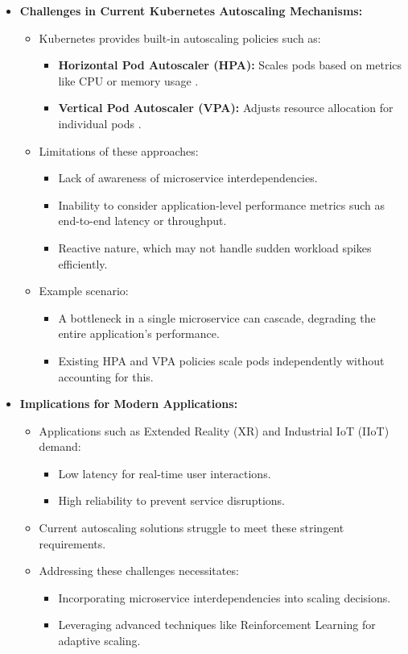 \documentclass[conference]{IEEEtran}
\begin{document}
\begin{itemize}
    \item \textbf{Challenges in Current Kubernetes Autoscaling Mechanisms:}
    \begin{itemize}
        \item Kubernetes provides built-in autoscaling policies such as:
        \begin{itemize}
            \item \textbf{Horizontal Pod Autoscaler (HPA):} Scales pods based on metrics like CPU or memory usage \cite{kubernetesHPA}.
            \item \textbf{Vertical Pod Autoscaler (VPA):} Adjusts resource allocation for individual pods \cite{kubernetesVPA}.
        \end{itemize}
        \item Limitations of these approaches:
        \begin{itemize}
            \item Lack of awareness of microservice interdependencies.
            \item Inability to consider application-level performance metrics such as end-to-end latency or throughput.
            \item Reactive nature, which may not handle sudden workload spikes efficiently.
        \end{itemize}
        \item Example scenario:
        \begin{itemize}
            \item A bottleneck in a single microservice can cascade, degrading the entire application's performance.
            \item Existing HPA and VPA policies scale pods independently without accounting for this.
        \end{itemize}
    \end{itemize}
    
    \item \textbf{Implications for Modern Applications:}
    \begin{itemize}
        \item Applications such as Extended Reality (XR) and Industrial IoT (IIoT) demand:
        \begin{itemize}
            \item Low latency for real-time user interactions.
            \item High reliability to prevent service disruptions.
        \end{itemize}
        \item Current autoscaling solutions struggle to meet these stringent requirements.
        \item Addressing these challenges necessitates:
        \begin{itemize}
            \item Incorporating microservice interdependencies into scaling decisions.
            \item Leveraging advanced techniques like Reinforcement Learning for adaptive scaling.
        \end{itemize}
    \end{itemize}
\end{itemize}
\end{document}
